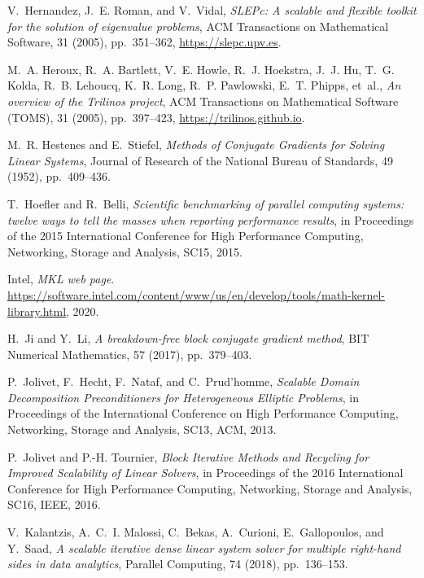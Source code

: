 \documentclass[3p,11pt]{elsarticle}
\begin{document}
\begin{thebibliography}{10}
{\sc V.~Hernandez, J.~E. Roman, and V.~Vidal}, {\em {SLEP}c: A scalable and
  flexible toolkit for the solution of eigenvalue problems}, ACM Transactions
  on Mathematical Software, 31 (2005), pp.~351--362,
  \url{https://slepc.upv.es}.

{\sc M.~A. Heroux, R.~A. Bartlett, V.~E. Howle, R.~J. Hoekstra, J.~J. Hu, T.~G.
  Kolda, R.~B. Lehoucq, K.~R. Long, R.~P. Pawlowski, E.~T. Phipps, et~al.},
  {\em {An overview of the Trilinos project}}, ACM Transactions on Mathematical
  Software (TOMS), 31 (2005), pp.~397--423, \url{https://trilinos.github.io}.

{\sc M.~R. Hestenes and E.~Stiefel}, {\em {Methods of Conjugate Gradients for
  Solving Linear Systems}}, Journal of Research of the National Bureau of
  Standards, 49 (1952), pp.~409--436.

{\sc T.~Hoefler and R.~Belli}, {\em Scientific benchmarking of parallel
  computing systems: twelve ways to tell the masses when reporting performance
  results}, in Proceedings of the 2015 International Conference for High
  Performance Computing, Networking, Storage and Analysis, SC15, 2015.

{\sc Intel}, {\em {MKL} web page}.
\newblock
  \url{https://software.intel.com/content/www/us/en/develop/tools/math-kernel-library.html},
  2020.

{\sc H.~Ji and Y.~Li}, {\em A breakdown-free block conjugate gradient method},
  BIT Numerical Mathematics, 57 (2017), pp.~379--403.

{\sc P.~Jolivet, F.~Hecht, F.~Nataf, and C.~Prud'homme}, {\em {Scalable Domain
  Decomposition Preconditioners for Heterogeneous Elliptic Problems}}, in
  Proceedings of the International Conference on High Performance Computing,
  Networking, Storage and Analysis, SC13, ACM, 2013.

{\sc P.~Jolivet and P.-H. Tournier}, {\em {Block Iterative Methods and
  Recycling for Improved Scalability of Linear Solvers}}, in Proceedings of the
  2016 International Conference for High Performance Computing, Networking,
  Storage and Analysis, SC16, IEEE, 2016.

{\sc V.~Kalantzis, A.~C.~I. Malossi, C.~Bekas, A.~Curioni, E.~Gallopoulos, and
  Y.~Saad}, {\em A scalable iterative dense linear system solver for multiple
  right-hand sides in data analytics}, Parallel Computing, 74 (2018),
  pp.~136--153.


\end{thebibliography}
\end{document}
